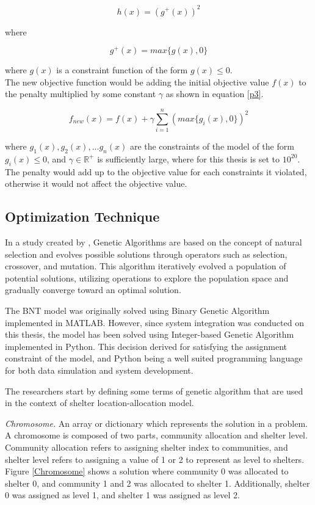 	\begin{equation} 
		\label{p1}
		h(x)=(g^+(x))^2
	\end{equation}
	
	where
	
	\begin{equation} 
		\label{p2}
		g^+(x)=max\{g(x),0\}
	\end{equation}
	
	where $g(x)$ is a constraint function of the form $g(x)\le0$. 
	\\
	The new objective function would be adding the initial objective value $f(x)$ to the penalty multiplied by some constant $\gamma$ as shown in equation \ref{p3}.
	
	\begin{equation} 
		\label{p3}
		f_{new}(x)=f(x)+\gamma\sum_{i=1}^{n}(max\{g_i(x),0\})^2
	\end{equation}
	
	where $g_1(x),g_2(x),...g_n(x)$ are the constraints of the model of the form $g_i(x)\le0$, and $\gamma\in\mathbb{R}^+$ is sufficiently large, where for this thesis is set to $10^{20}$. The penalty would add up to the objective value for each constraints it violated, otherwise it would not affect the objective value.	
	
\subsection{Optimization Technique}
	In a study created by \textcite{Mathew2012}, Genetic Algorithms are based on the concept of natural selection and evolves possible solutions through operators such as selection, crossover, and mutation. This algorithm iteratively evolved a population of potential solutions, utilizing operations to explore the population space and gradually converge toward an optimal solution.
	
	The BNT model was originally solved using Binary Genetic Algorithm implemented in MATLAB. However, since system integration was conducted on this thesis, the model has been solved using Integer-based Genetic Algorithm implemented in Python. This decision derived for satisfying the assignment constraint of the model, and Python being a well suited programming language for both data simulation and system development.
	
	The researchers start by defining some terms of genetic algorithm that are used in the context of shelter location-allocation model.
	
	\textit{Chromosome.}  An array or dictionary which represents the  solution in a problem. A chromosome is composed of two parts, community allocation and shelter level. Community allocation refers to assigning shelter index to communities, and shelter level refers to assigning a value of 1 or 2 to represent as level to shelters. Figure \ref{Chromosome} shows a solution where community 0 was allocated to shelter 0, and community 1 and 2 was allocated to shelter 1. Additionally, shelter 0 was assigned as level 1, and shelter 1 was assigned as level 2.
	

